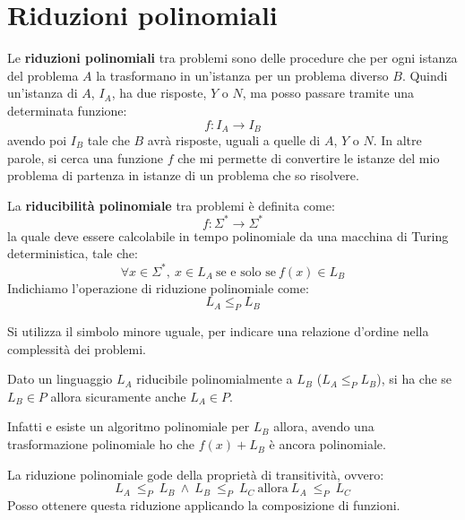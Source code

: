\section{Riduzioni polinomiali}
Le \textbf{riduzioni polinomiali} tra problemi sono delle procedure che per ogni
istanza del problema $A$ la trasformano in un'istanza per un problema diverso $B$.
Quindi un'istanza di $A$, $I_A$, ha due risposte, $Y$ o $N$, ma posso passare tramite
una determinata funzione:
\begin{equation}
    f: I_A \to I_B
\end{equation}
avendo poi $I_B$ tale che $B$ avrà risposte, uguali a quelle di $A$, $Y$ o $N$.
In altre parole, si cerca una funzione $f$ che mi permette di convertire le
istanze del mio problema di partenza in istanze di un problema che so risolvere.
\begin{definizione}
    La \textbf{riducibilità polinomiale} tra problemi è definita come:
    \begin{equation}
        f: \Sigma^{\ast} \to \Sigma^{\ast}
    \end{equation}
    la quale deve essere calcolabile in tempo polinomiale da una macchina di Turing
    deterministica, tale che:
    \begin{equation}
        \forall x \in \Sigma^{\ast}, \ x \in L_A \ \text{se e solo se} \ f(x) \in L_B
    \end{equation}
    Indichiamo l'operazione di riduzione polinomiale come:
    \begin{equation}
        L_A \leq_P L_B
    \end{equation}
\end{definizione}
\begin{osservazione}
    Si utilizza il simbolo minore uguale, per indicare una relazione d'ordine
    nella complessità dei problemi.
\end{osservazione}
\begin{teorema}
    Dato un linguaggio $L_A$ riducibile polinomialmente a $L_B$ ($L_A \leq_P L_B$),
    si ha che se $L_B \in P$ allora sicuramente anche $L_A \in P$.
\end{teorema}
\begin{dimostrazione}
    Infatti e esiste un algoritmo polinomiale per $L_B$ allora, avendo una
    trasformazione polinomiale ho che $f(x) + L_B$ è ancora polinomiale.
\end{dimostrazione}
\begin{teorema}
    La riduzione polinomiale gode della proprietà di transitività, ovvero:
    \begin{equation}
        L_A \ \leq_P \ L_B \ \land \ L_B \ \leq_P \ L_C \ \text{allora} \ L_A \ \leq_P \ L_C
    \end{equation}
    Posso ottenere questa riduzione applicando la composizione di funzioni.
\end{teorema}
